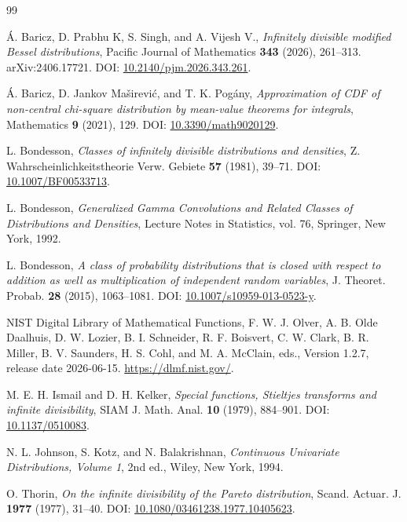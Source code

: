 ﻿\documentclass[preprint,12pt,authoryear]{elsarticle}
\begin{document}
\begin{thebibliography}{99}

\'A. Baricz, D. Prabhu K, S. Singh, and A. Vijesh V.,
\newblock \emph{Infinitely divisible modified Bessel distributions},
\newblock Pacific Journal of Mathematics \textbf{343} (2026), 261--313.
\newblock arXiv:2406.17721.
\newblock DOI: \href{https://doi.org/10.2140/pjm.2026.343.261}{10.2140/pjm.2026.343.261}.

\'A. Baricz, D. Jankov Ma\v{s}irevi\'c, and T. K. Pog\'any,
\newblock \emph{Approximation of CDF of non-central chi-square distribution by mean-value theorems for integrals},
\newblock Mathematics \textbf{9} (2021), 129.
\newblock DOI: \href{https://doi.org/10.3390/math9020129}{10.3390/math9020129}.

L. Bondesson,
\newblock \emph{Classes of infinitely divisible distributions and densities},
\newblock Z. Wahrscheinlichkeitstheorie Verw. Gebiete \textbf{57} (1981), 39--71.
\newblock DOI: \href{https://doi.org/10.1007/BF00533713}{10.1007/BF00533713}.

L. Bondesson,
\newblock \emph{Generalized Gamma Convolutions and Related Classes of Distributions and Densities},
\newblock Lecture Notes in Statistics, vol. 76,
\newblock Springer, New York, 1992.

L. Bondesson,
\newblock \emph{A class of probability distributions that is closed with respect to addition as well as multiplication of independent random variables},
\newblock J. Theoret. Probab. \textbf{28} (2015), 1063--1081.
\newblock DOI: \href{https://doi.org/10.1007/s10959-013-0523-y}{10.1007/s10959-013-0523-y}.

NIST Digital Library of Mathematical Functions,
\newblock F. W. J. Olver, A. B. Olde Daalhuis, D. W. Lozier, B. I. Schneider, R. F. Boisvert,
C. W. Clark, B. R. Miller, B. V. Saunders, H. S. Cohl, and M. A. McClain, eds.,
\newblock Version 1.2.7, release date 2026-06-15.
\newblock \url{https://dlmf.nist.gov/}.

M. E. H. Ismail and D. H. Kelker,
\newblock \emph{Special functions, Stieltjes transforms and infinite divisibility},
\newblock SIAM J. Math. Anal. \textbf{10} (1979), 884--901.
\newblock DOI: \href{https://doi.org/10.1137/0510083}{10.1137/0510083}.

N. L. Johnson, S. Kotz, and N. Balakrishnan,
\newblock \emph{Continuous Univariate Distributions, Volume 1},
\newblock 2nd ed.,
\newblock Wiley, New York, 1994.

O. Thorin,
\newblock \emph{On the infinite divisibility of the Pareto distribution},
\newblock Scand. Actuar. J. \textbf{1977} (1977), 31--40.
\newblock DOI: \href{https://doi.org/10.1080/03461238.1977.10405623}{10.1080/03461238.1977.10405623}.

\end{thebibliography}
\end{document}
